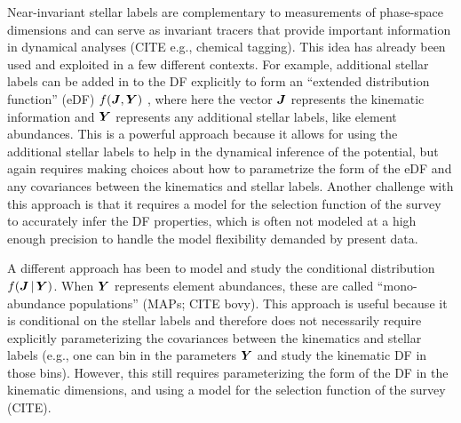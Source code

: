 
Near-invariant stellar labels are complementary to measurements of phase-space
dimensions and can serve as invariant tracers that provide important information in
dynamical analyses (CITE e.g., chemical tagging).
This idea has already been used and exploited in a few different contexts.
For example, additional stellar labels can be added in to the DF explicitly to form an
``extended distribution function'' (eDF) $f(\boldsymbol{J}, \boldsymbol{Y})$
\citep[e.g.,][]{Sanders:2015, Binney:2023}, where here the vector $\boldsymbol{J}$ represents
the kinematic information and $\boldsymbol{Y}$ represents any additional stellar labels, like
element abundances.
This is a powerful approach because it allows for using the additional stellar labels to
help in the dynamical inference of the potential, but again requires making choices
about how to parametrize the form of the eDF and any covariances between the kinematics
and stellar labels.
Another challenge with this approach is that it requires a model for the selection
function of the survey to accurately infer the DF properties, which is often not modeled
at a high enough precision to handle the model flexibility demanded by present data.

A different approach has been to model and study the conditional distribution $f(\boldsymbol{J}
\,|\, \boldsymbol{Y})$.
When $\boldsymbol{Y}$ represents element abundances, these are called ``mono-abundance
populations'' (MAPs; CITE bovy).
This approach is useful because it is conditional on the stellar labels and therefore
does not necessarily require explicitly parameterizing the covariances between the
kinematics and stellar labels (e.g., one can bin in the parameters $\boldsymbol{Y}$ and study
the kinematic DF in those bins).
However, this still requires parameterizing the form of the DF in the kinematic
dimensions, and using a model for the selection function of the survey (CITE).

